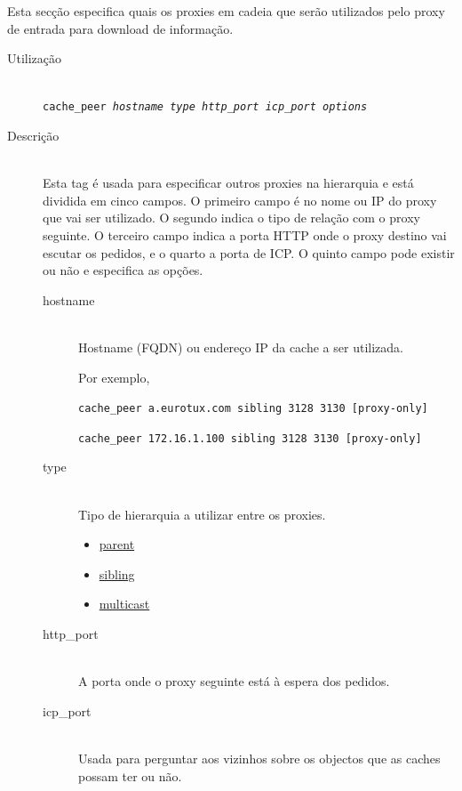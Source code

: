Esta secção especifica quais os proxies em cadeia que serão
utilizados pelo proxy de entrada para download de informação.


\begin{description}
\item[Utilização]~\\
\texttt{cache\_peer \emph{hostname} \emph{type}
\emph{http\_port} \emph{icp\_port} \emph{options}}

\item[Descrição]~\\
Esta tag é usada para especificar outros proxies na hierarquia e
está dividida em cinco campos.
O primeiro campo é no nome ou IP do proxy que vai ser utilizado.
O segundo indica o tipo de relação com o proxy seguinte.
O terceiro campo indica a porta HTTP onde o proxy destino vai
escutar os pedidos, e o quarto a porta de ICP.
O quinto campo pode existir ou não e especifica as opções.

\begin{description}
\item[hostname]~\\
Hostname (FQDN) ou endereço IP da cache a ser utilizada.

Por exemplo,

\texttt{cache\_peer a.eurotux.com sibling 3128 3130 [proxy{}-only]}

\texttt{cache\_peer 172.16.1.100 sibling 3128 3130 [proxy{}-only]}

\item[type]~\\
Tipo de hierarquia a utilizar entre os proxies.

\begin{itemize}
\item
\href{http://squid.visolve.com/squid/squid24s1/glossary.htm#parent}{parent}

\item
\href{http://squid.visolve.com/squid/squid24s1/glossary.htm#sibling}{sibling}

\item
\href{http://squid.visolve.com/squid/squid24s1/glossary.htm#multicast}{multicast}
\end{itemize}

\item[http\_port]~\\
A porta onde o proxy seguinte está à espera dos pedidos.

\item[icp\_port]~\\
Usada para perguntar aos vizinhos sobre os objectos que as caches possam
ter ou não.


\end{description}
\end{description}
